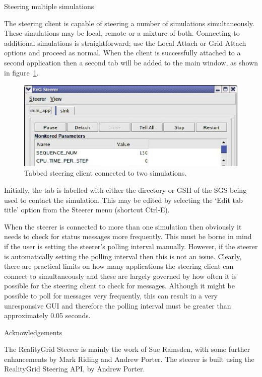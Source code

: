 \documentclass[a4paper,twoside]{article}
\begin{document}
\begin{section}{Steering multiple simulations}
\label{sec:multiple_sims}

The steering client is capable of steering a number of simulations
simultaneously.  These simulations may be local, remote or a mixture
of both.  Connecting to additional simulations is straightforward; use
the Local Attach or Grid Attach options and proceed as normal.  When
the client is successfully attached to a second application then a
second tab will be added to the main window, as shown in
figure~\ref{fig:tabbed}.

\begin{figure}
\centerline{\includegraphics{tabbed_steerer.eps}}
\caption{Tabbed steering client connected to two simulations.}
\label{fig:tabbed}
\end{figure}

Initially, the tab is labelled with either the directory or GSH of the
SGS being used to contact the simulation.  This may be edited by
selecting the `Edit tab title' option from the Steerer menu (shortcut
Ctrl-E).

When the steerer is connected to more than one simulation then
obviously it needs to check for status messages more frequently.  This
must be borne in mind if the user is setting the steerer's polling
interval manually.  However, if the steerer is automatically setting
the polling interval then this is not an issue.  Clearly, there are
practical limits on how many applications the steering client can
connect to simultaneously and these are largely governed by how often
it is possible for the steering client to check for messages.
Although it might be possible to poll for messages very frequently,
this can result in a very unresponsive GUI and therefore the polling
interval must be greater than approximately 0.05 seconds.

\end{section} %


\begin{section}{Acknowledgements}

The RealityGrid Steerer is mainly the work of Sue Ramsden, with some
further enhancements by Mark Riding and Andrew Porter. The steerer is
built using the RealityGrid Steering API, by Andrew Porter.

\end{section}
\end{document}
